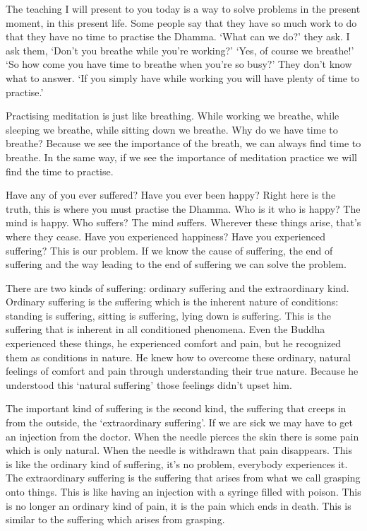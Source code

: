 The teaching I will present to you today is a way to solve problems in the present moment, in this present life. Some people say that they have so much work to do that they have no time to practise the Dhamma. `What can we do?' they ask. I ask them, `Don't you breathe while you're working?' `Yes, of course we breathe!' `So how come you have time to breathe when you're so busy?' They don't know what to answer. `If you simply have  while working you will have plenty of time to practise.'

Practising meditation is just like breathing. While working we breathe, while sleeping we breathe, while sitting down we breathe. Why do we have time to breathe? Because we see the importance of the breath, we can always find time to breathe. In the same way, if we see the importance of meditation practice we will find the time to practise.

Have any of you ever suffered? Have you ever been happy? Right here is the truth, this is where you must practise the Dhamma. Who is it who is happy? The mind is happy. Who suffers? The mind suffers. Wherever these things arise, that's where they cease. Have you experienced happiness? Have you experienced suffering? This is our problem. If we know  the cause of suffering, the end of suffering and the way leading to the end of suffering we can solve the problem.

There are two kinds of suffering: ordinary suffering and the extraordinary kind. Ordinary suffering is the suffering which is the inherent nature of conditions: standing is suffering, sitting is suffering, lying down is suffering. This is the suffering that is inherent in all conditioned phenomena. Even the Buddha experienced these things, he experienced comfort and pain, but he recognized them as conditions in nature. He knew how to overcome these ordinary, natural feelings of comfort and pain through understanding their true nature. Because he understood this `natural suffering' those feelings didn't upset him.

The important kind of suffering is the second kind, the suffering that creeps in from the outside, the `extraordinary suffering'. If we are sick we may have to get an injection from the doctor. When the needle pierces the skin there is some pain which is only natural. When the needle is withdrawn that pain disappears. This is like the ordinary kind of suffering, it's no problem, everybody experiences it. The extraordinary suffering is the suffering that arises from what we call  grasping onto things. This is like having an injection with a syringe filled with poison. This is no longer an ordinary kind of pain, it is the pain which ends in death. This is similar to the suffering which arises from grasping.

